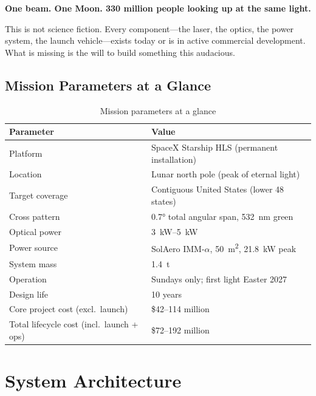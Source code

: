 \documentclass[10pt,letterpaper]{article}
\begin{document}
\begin{emeraldquote}
  \textbf{One beam. One Moon. 330 million people looking up at the same light.}
\end{emeraldquote}

This is not science fiction. Every component---the laser, the optics, the power
system, the launch vehicle---exists today or is in active commercial
development. What is missing is the will to build something this audacious.

\subsection{Mission Parameters at a Glance}

\begin{table}[!ht]
\centering\small
\caption{Mission parameters at a glance}
\label{tab:mission-params}
\begin{tabularx}{\linewidth}{XX}
\toprule
\textbf{Parameter} & \textbf{Value} \\
\midrule
Platform & SpaceX Starship HLS (permanent installation) \\
Location & Lunar north pole (peak of eternal light) \\
Target coverage & Contiguous United States (lower 48 states) \\
Cross pattern & \ang{0.7} total angular span, \SI{532}{\nano\meter} green \\
Optical power & \SI{3}{\kilo\watt}--\SI{5}{\kilo\watt} \\
Power source & SolAero IMM-\(\alpha\), \SI{50}{\meter\squared}, \SI{21.8}{\kilo\watt} peak \\
System mass & \SI{1.4}{\tonne} \\
Operation & Sundays only; first light Easter 2027 \\
Design life & 10 years \\
Core project cost (excl.\ launch) & \$42--114 million \\
Total lifecycle cost (incl.\ launch + ops) & \$72--192 million \\
\bottomrule
\end{tabularx}
\end{table}

\section{System Architecture}
\end{document}
